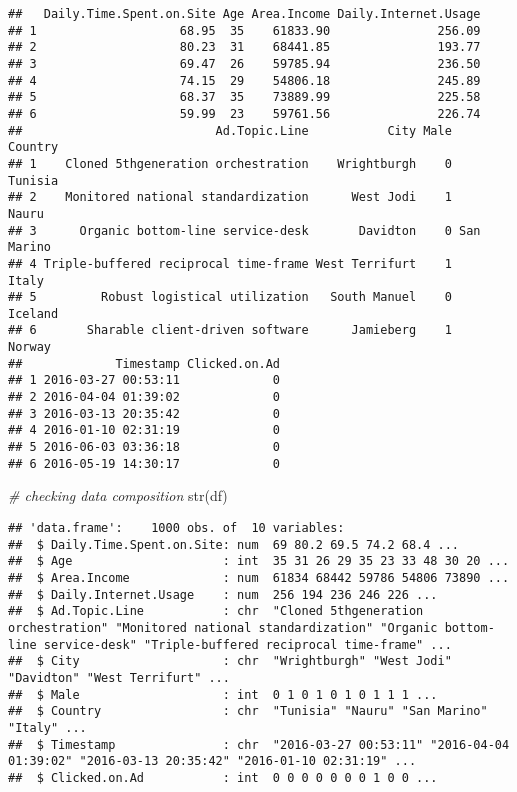 \documentclass[
]{article}
\newenvironment{Shaded}{\begin{snugshade}}{\end{snugshade}}
\newcommand{\CommentTok}[1]{\textcolor[rgb]{0.56,0.35,0.01}{\textit{#1}}}
\newcommand{\FunctionTok}[1]{\textcolor[rgb]{0.00,0.00,0.00}{#1}}
\newcommand{\NormalTok}[1]{#1}
\begin{document}
\begin{verbatim}
##   Daily.Time.Spent.on.Site Age Area.Income Daily.Internet.Usage
## 1                    68.95  35    61833.90               256.09
## 2                    80.23  31    68441.85               193.77
## 3                    69.47  26    59785.94               236.50
## 4                    74.15  29    54806.18               245.89
## 5                    68.37  35    73889.99               225.58
## 6                    59.99  23    59761.56               226.74
##                           Ad.Topic.Line           City Male    Country
## 1    Cloned 5thgeneration orchestration    Wrightburgh    0    Tunisia
## 2    Monitored national standardization      West Jodi    1      Nauru
## 3      Organic bottom-line service-desk       Davidton    0 San Marino
## 4 Triple-buffered reciprocal time-frame West Terrifurt    1      Italy
## 5         Robust logistical utilization   South Manuel    0    Iceland
## 6       Sharable client-driven software      Jamieberg    1     Norway
##             Timestamp Clicked.on.Ad
## 1 2016-03-27 00:53:11             0
## 2 2016-04-04 01:39:02             0
## 3 2016-03-13 20:35:42             0
## 4 2016-01-10 02:31:19             0
## 5 2016-06-03 03:36:18             0
## 6 2016-05-19 14:30:17             0
\end{verbatim}

\begin{Shaded}
\begin{Highlighting}[]
\CommentTok{\# checking data composition}
\FunctionTok{str}\NormalTok{(df)}
\end{Highlighting}
\end{Shaded}

\begin{verbatim}
## 'data.frame':    1000 obs. of  10 variables:
##  $ Daily.Time.Spent.on.Site: num  69 80.2 69.5 74.2 68.4 ...
##  $ Age                     : int  35 31 26 29 35 23 33 48 30 20 ...
##  $ Area.Income             : num  61834 68442 59786 54806 73890 ...
##  $ Daily.Internet.Usage    : num  256 194 236 246 226 ...
##  $ Ad.Topic.Line           : chr  "Cloned 5thgeneration orchestration" "Monitored national standardization" "Organic bottom-line service-desk" "Triple-buffered reciprocal time-frame" ...
##  $ City                    : chr  "Wrightburgh" "West Jodi" "Davidton" "West Terrifurt" ...
##  $ Male                    : int  0 1 0 1 0 1 0 1 1 1 ...
##  $ Country                 : chr  "Tunisia" "Nauru" "San Marino" "Italy" ...
##  $ Timestamp               : chr  "2016-03-27 00:53:11" "2016-04-04 01:39:02" "2016-03-13 20:35:42" "2016-01-10 02:31:19" ...
##  $ Clicked.on.Ad           : int  0 0 0 0 0 0 0 1 0 0 ...
\end{verbatim}
\end{document}
